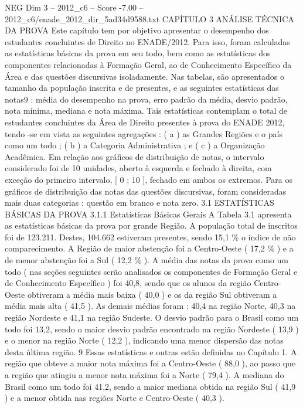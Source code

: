 \begin{textsample}{NEG Dim 3 – 2012\_c6 – Score -7.00 – 2012\_c6/enade\_2012\_dir\_5ad34d9588.txt}  \label{ex:f3_neg_026}
CAPÍTULO 3 ANÁLISE TÉCNICA DA PROVA Este capítulo tem por objetivo apresentar o desempenho dos estudantes concluintes de Direito no ENADE/2012.
Para isso, foram calculadas as estatísticas básicas da prova em seu todo, bem como as estatísticas dos componentes relacionadas à Formação Geral, ao de Conhecimento Específico da Área e das questões discursivas isoladamente.
Nas tabelas, são apresentados o tamanho da população inscrita e de presentes, e as seguintes estatísticas das notas9 : média do desempenho na prova, erro padrão da média, desvio padrão, nota mínima, mediana e nota máxima.
Tais estatísticas contemplam o total de estudantes concluintes da Área de Direito presentes à prova do ENADE 2012, tendo -se em vista as seguintes agregações : ( a ) as Grandes Regiões e o país como um todo ; ( b ) a Categoria Administrativa ; e ( c ) a Organização Acadêmica.
Em relação aos gráficos de distribuição de notas, o intervalo considerado foi de 10 unidades, aberto à esquerda e fechado à direita, com exceção do primeiro intervalo, [ 0 ; 10 ], fechado em ambos os extremos.
Para os gráficos de distribuição das notas das questões discursivas, foram consideradas mais duas categorias : questão em branco e nota zero. 3.1 ESTATÍSTICAS BÁSICAS DA PROVA 3.1.1 Estatísticas Básicas Gerais A Tabela 3.1 apresenta as estatísticas básicas da prova por grande Região.
A população total de inscritos foi de 123.211.
Destes, 104.662 estiveram presentes, sendo 15,1 \% o índice de não comparecimento.
A Região de maior abstenção foi a Centro-Oeste ( 17,2 \% ) e a de menor abstenção foi a Sul ( 12,2 \% ).
A média das notas da prova como um todo ( nas seções seguintes serão analisados os componentes de Formação Geral e de Conhecimento Específico ) foi 40,8, sendo que os alunos da região Centro-Oeste obtiveram a média mais baixa ( 40,0 ) e os da região Sul obtiveram a média mais alta ( 41,5 ).
As demais médias foram : 40,4 na região Norte, 40,3 na região Nordeste e 41,1 na região Sudeste.
O desvio padrão para o Brasil como um todo foi 13,2, sendo o maior desvio padrão encontrado na região Nordeste ( 13,9 ) e o menor na região Norte ( 12,2 ), indicando uma menor dispersão das notas desta última região. 9 Essas estatísticas e outras estão definidas no Capítulo 1.
A região que obteve a maior nota máxima foi a Centro-Oeste ( 88,0 ), ao passo que a região que atingiu a menor nota máxima foi a Norte ( 79,4 ).
A mediana do Brasil como um todo foi 41,2, sendo a maior mediana obtida na região Sul ( 41,9 ) e a menor obtida nas regiões Norte e Centro-Oeste ( 40,3 ).

\end{textsample}
